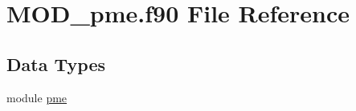 \hypertarget{MOD__pme_8f90}{\section{M\-O\-D\-\_\-pme.\-f90 File Reference}
\label{MOD__pme_8f90}
}
\subsection*{Data Types}
\begin{DoxyCompactItemize}
\item 
module \hyperlink{classpme}{pme}
\end{DoxyCompactItemize}
